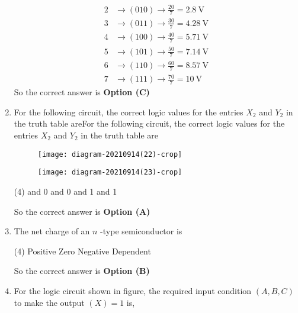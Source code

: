 \begin{enumerate}
\begin{answer}
\begin{align*}
2& \rightarrow(010) \rightarrow \frac{20}{7}=2.8 \mathrm{~V}\\
3& \rightarrow(011) \rightarrow \frac{30}{7}=4.28 \mathrm{~V}\\
4& \rightarrow(100) \rightarrow \frac{40}{7}=5.71 \mathrm{~V}\\
5& \rightarrow(101) \rightarrow \frac{50}{7}=7.14 \mathrm{~V}\\
6& \rightarrow(110) \rightarrow \frac{60}{7}=8.57 \mathrm{~V}\\
7& \rightarrow(111) \rightarrow \frac{70}{7}=10 \mathrm{~V}
\end{align*}
So the correct answer is \textbf{Option (C)}
\end{answer}
\item 	For the following circuit, the correct logic values for the entries $X_{2}$ and $Y_{2}$ in the truth table areFor the following circuit, the correct logic values for the entries $X_{2}$ and $Y_{2}$ in the truth table are
{}\\
\begin{minipage}{0.45\textwidth}
\begin{figure}[H]
	\centering
	\texttt{[image: diagram-20210914(22)-crop]}
\end{figure}
\end{minipage}
\begin{minipage}{0.45\textwidth}
\begin{figure}[H]
	\centering
	\texttt{[image: diagram-20210914(23)-crop]}
\end{figure}
\end{minipage}
\begin{tasks}(4)
 and 0
 and 0 
 and 1
 and 1
\end{tasks}
\begin{answer}
So the correct answer is \textbf{Option (A)} 
\end{answer}
	\item The net charge of an $n$ -type semiconductor is
	{}
\begin{tasks}(4)
\task[\textbf{A.}] Positive
\task[\textbf{B.}] Zero
\task[\textbf{C.}] Negative
\task[\textbf{D.}] Dependent
\end{tasks}
\begin{answer}
So the correct answer is \textbf{Option (B)}
\end{answer}
	\item For the logic circuit shown in figure, the required input condition $(A, B, C)$ to make the output $(X)=1$ is,

\end{enumerate}
